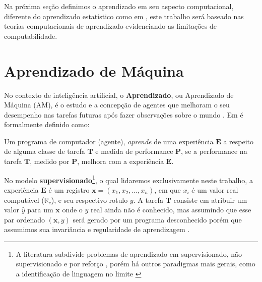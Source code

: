 Na próxima seção definimos o aprendizado em seu aspecto computacional,
diferente do aprendizado estatístico como em \cite{friedman2001elements}, este
trabalho será baseado nas teorias computacionais de aprendizado
\cite{valiant1984theory,gold1967language,kearns1994introduction} evidenciando
as limitações de computabilidade.

\section{Aprendizado de Máquina}
\label{sec:aprendizado-de-maquina}

No contexto de inteligência artificial, o \textbf{Aprendizado}, ou Aprendizado
de Máquina (AM), é o estudo e a concepção de agentes que melhoram o seu
desempenho nas tarefas futuras após fazer observações sobre o mundo
\cite{russell2016artificial, mohri2018foundations}. Em
\cite{mitchell1997machine} é formalmente definido como:

\begin{definition}
Um programa de computador (agente), \textit{aprende} de uma experiência
$\boldsymbol E$ a respeito de alguma classe de tarefa $\boldsymbol T$ e medida
de performance $\boldsymbol P$, se a performance na tarefa $\boldsymbol T$,
medido por $\boldsymbol P$, melhora com a experiência $\boldsymbol E$.
\end{definition}

No modelo \textbf{supervisionado}\footnote{A literatura subdivide problemas de
aprendizado em supervisionado, não supervisionado e por reforço
\cite{russell2016artificial,friedman2001elements,goodfellow2016deep},
porém há outros paradigmas mais gerais, como a identificação de linguagem no
limite \cite{gold1967language}}, o qual lidaremos exclusivamente neste
trabalho, a experiência $\boldsymbol E$ é um registro
$\boldsymbol{x}=(x_1,x_2,...,x_n)$, em que $x_i$ é um valor real computável
($\mathbb{R}_c$), e seu respectivo rotulo $y$. A tarefa $\boldsymbol T$
consiste em atribuir um valor $\hat{y}$ para um $\boldsymbol{x}$ onde o $y$
real ainda não é conhecido, mas assumindo que esse par ordenado
$(\boldsymbol{x},y)$ será gerado por um programa desconhecido porém que
assumimos sua invariância e regularidade de aprendizagem
\cite{mohri2018foundations,valiant1984theory}.

